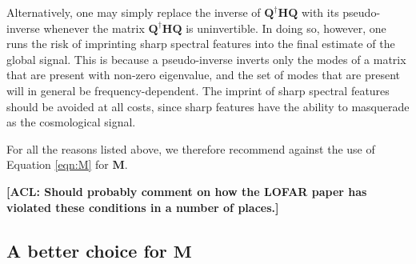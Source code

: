 \documentclass[twolcolumn,apj,iop,numberedappendix]{emulateapj}
\newcommand{\Hmat}{\mathbf{H}}
\newcommand{\Q}{\mathbf{Q}}
\newcommand{\M}{\mathbf{M}}
\newcommand{\acl}[1]{{\color{red} \textbf{[ACL:  #1]}}}
\begin{document}
Alternatively, one may simply replace the inverse of $\Q^\dagger \Hmat \Q$ with its pseudo-inverse whenever the matrix $\Q^\dagger \Hmat \Q$ is uninvertible. In doing so, however, one runs the risk of imprinting sharp spectral features into the final estimate of the global signal. This is because a pseudo-inverse inverts only the modes of a matrix that are present with non-zero eigenvalue, and the set of modes that are present will in general be frequency-dependent. The imprint of sharp spectral features should be avoided at all costs, since sharp features have the ability to masquerade as the cosmological signal.

For all the reasons listed above, we therefore recommend against the use of Equation \eqref{eqn:M} for $\M$. 

\acl{Should probably comment on how the LOFAR paper has violated these conditions in a number of places.}



\subsection{A better choice for $\M$}
\label{sec:BetterM}
\end{document}
